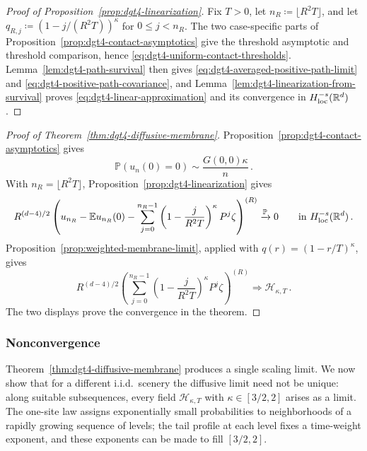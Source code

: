 \documentclass[11pt]{amsart}
\theoremstyle{plain}
\theoremstyle{definition}
\newcommand{\R}{\mathbb{R}}
\newcommand{\E}{\mathbb{E}}
\renewcommand{\P}{\mathbb{P}}
\begin{document}
	\begin{proof}[Proof of Proposition~\ref{prop:dgt4-linearization}]
	Fix $T>0$, let $n_R\coloneqq\lfloor R^2T\rfloor$, and let
	$q_{R,j}\coloneqq(1-j/(R^2T))^\kappa$ for $0\leq j<n_R$.
	The two case-specific parts of Proposition~\ref{prop:dgt4-contact-asymptotics}
	give the threshold asymptotic and threshold comparison, hence
	\eqref{eq:dgt4-uniform-contact-thresholds}. Lemma~\ref{lem:dgt4-path-survival}
	then gives \eqref{eq:dgt4-averaged-positive-path-limit} and
	\eqref{eq:dgt4-positive-path-covariance}, and
	Lemma~\ref{lem:dgt4-linearization-from-survival} proves
	\eqref{eq:dgt4-linear-approximation} and its convergence in
	$H^{-s}_{\rm loc}(\R^d)$.
\end{proof}

\begin{proof}[Proof of Theorem~\ref{thm:dgt4-diffusive-membrane}]
	Proposition~\ref{prop:dgt4-contact-asymptotics} gives
	\[
		\P(u_n(0)=0)\sim\frac{G(0,0)\kappa}{n}\, .
	\]
	With $n_R=\lfloor R^2T\rfloor$, Proposition~\ref{prop:dgt4-linearization}
	gives
	\[
	R^{(d-4)/2}\left(
	u_{n_R}-\E u_{n_R}(0)
	-\sum_{j=0}^{n_R-1}
	\left(1-\frac{j}{R^2T}\right)^\kappa P^j\zeta
	\right)^{(R)}
	\xrightarrow{\P}0
	\qquad\text{in }H^{-s}_{\rm loc}(\R^d)\, .
	\]
	Proposition~\ref{prop:weighted-membrane-limit}, applied with
	$q(r)=(1-r/T)^\kappa$, gives
	\[
	R^{(d-4)/2}
	\left(\sum_{j=0}^{n_R-1}
	\left(1-\frac{j}{R^2T}\right)^\kappa P^j\zeta\right)^{(R)}
	\Longrightarrow\mathcal H_{\kappa,T}\, .
	\]
	The two displays prove the convergence in the theorem.
\end{proof}
\subsubsection{Nonconvergence}
	Theorem~\ref{thm:dgt4-diffusive-membrane} produces a single scaling limit. We now show
	that for a different i.i.d.\ scenery the diffusive limit need not be unique: along
	suitable subsequences, every field $\mathcal H_{\kappa,T}$ with $\kappa\in[3/2,2]$ arises
	as a limit. The one-site law assigns exponentially small probabilities to
	neighborhoods of a rapidly growing sequence of levels; the tail profile at each level fixes a time-weight exponent, and
	these exponents can be made to fill $[3/2,2]$.
\end{document}
